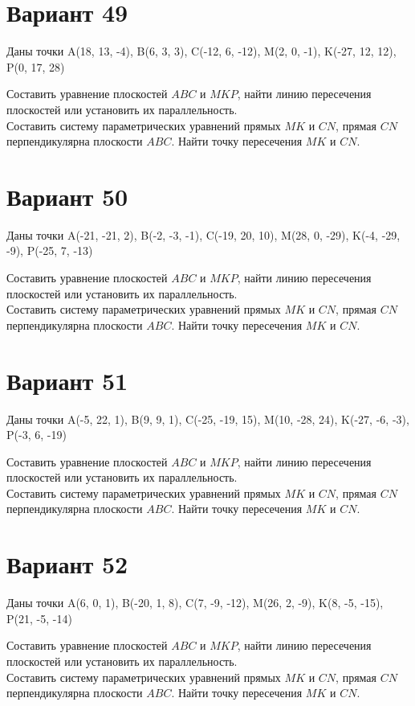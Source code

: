 \documentclass[11pt]{article}
\begin{document}
\section*{Вариант 49}
Даны точки A(18, 13, -4), B(6, 3, 3), C(-12, 6, -12), M(2, 0, -1), K(-27, 12, 12), P(0, 17, 28)

Составить уравнение плоскостей $ABC$ и $MKP$, найти линию пересечения плоскостей или установить их параллельность.\\
Составить систему параметрических уравнений прямых $MK$ и $CN$, прямая $CN$ перпендикулярна плоскости $ABC$. Найти точку пересечения $MK$ и $CN$.

\section*{Вариант 50}
Даны точки A(-21, -21, 2), B(-2, -3, -1), C(-19, 20, 10), M(28, 0, -29), K(-4, -29, -9), P(-25, 7, -13)

Составить уравнение плоскостей $ABC$ и $MKP$, найти линию пересечения плоскостей или установить их параллельность.\\
Составить систему параметрических уравнений прямых $MK$ и $CN$, прямая $CN$ перпендикулярна плоскости $ABC$. Найти точку пересечения $MK$ и $CN$.

\section*{Вариант 51}
Даны точки A(-5, 22, 1), B(9, 9, 1), C(-25, -19, 15), M(10, -28, 24), K(-27, -6, -3), P(-3, 6, -19)

Составить уравнение плоскостей $ABC$ и $MKP$, найти линию пересечения плоскостей или установить их параллельность.\\
Составить систему параметрических уравнений прямых $MK$ и $CN$, прямая $CN$ перпендикулярна плоскости $ABC$. Найти точку пересечения $MK$ и $CN$.

\section*{Вариант 52}
Даны точки A(6, 0, 1), B(-20, 1, 8), C(7, -9, -12), M(26, 2, -9), K(8, -5, -15), P(21, -5, -14)

Составить уравнение плоскостей $ABC$ и $MKP$, найти линию пересечения плоскостей или установить их параллельность.\\
Составить систему параметрических уравнений прямых $MK$ и $CN$, прямая $CN$ перпендикулярна плоскости $ABC$. Найти точку пересечения $MK$ и $CN$.
\end{document}
